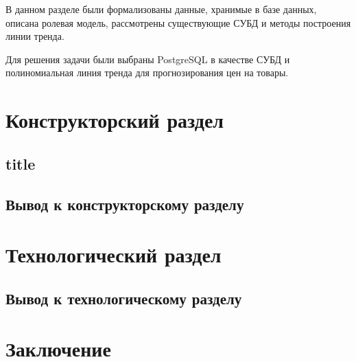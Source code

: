\documentclass[a4paper,14pt]{extreport}
\begin{document}
В данном разделе были формализованы данные, хранимые в базе данных, описана ролевая модель, рассмотрены существующие СУБД и методы построения линии тренда.

Для решения задачи были выбраны PostgreSQL в качестве СУБД и полиномиальная линия тренда для прогнозирования цен на товары.

\chapter{Конструкторский раздел}

\section{title}

\section*{Вывод к конструкторскому разделу}

\chapter{Технологический раздел}

\section*{Вывод к технологическому разделу}

\chapter*{Заключение}


\newpage
{}
\renewcommand\bibname{Список литературы}
\end{document}

